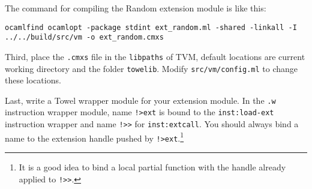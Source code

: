 \documentclass{article}
\newcommand{\inst}[1] {\texttt{inst:#1}}
\begin{document}
The command for compiling the Random extension module is like this:\newline

\texttt{ocamlfind ocamlopt -package stdint ext\_random.ml -shared -linkall -I ../../build/src/vm -o ext\_random.cmxs}
\newline

Third, place the \texttt{.cmxs} file in the \texttt{libpaths} of TVM, default locations are current working directory and the folder \texttt{towelib}. Modify \texttt{src/vm/config.ml} to change these locations.

Last, write a Towel wrapper module for your extension module. In the \texttt{.w} instruction wrapper module, name \texttt{!>ext} is bound to the \inst{load-ext} instruction wrapper and name \texttt{!>>} for \inst{extcall}. You should always bind a name to the extension handle pushed by \texttt{!>ext}.\footnote{It is a good idea to bind a local partial function with the handle already applied to \texttt{!>>}.}
\end{document}
